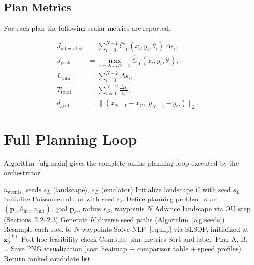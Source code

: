 \documentclass[11pt,a4paper]{article}
\begin{document}
\subsection{Plan Metrics}

For each plan the following scalar metrics are reported:

\begin{align}
  J_{\mathrm{integrated}} &= \sum_{i=0}^{N-2} \bar{C}_{\mathrm{fp}}(x_i, y_i, \theta_i)\,\Delta s_i, \\[4pt]
  J_{\mathrm{peak}}       &= \max_{i=0,\ldots,N-1} \hat{C}_{\mathrm{fp}}(x_i, y_i, \theta_i), \\[4pt]
  L_{\mathrm{total}}      &= \sum_{i=0}^{N-2} \Delta s_i, \\[4pt]
  T_{\mathrm{total}}      &= \sum_{i=0}^{N-2} \frac{\Delta s_i}{\bar{v}_i}, \\[4pt]
  d_{\mathrm{goal}}       &= \|(x_{N-1} - x_G,\; y_{N-1} - y_G)\|_2.
\end{align}

\section{Full Planning Loop}

Algorithm~\ref{alg:main} gives the complete online planning loop executed by
the orchestrator.

\begin{algorithm}[H]
\caption{Online constrained path-planning loop}
\label{alg:main}
\begin{algorithmic}[1]
\Require $n_{\mathrm{events}}$, seeds $s_L$ (landscape), $s_E$ (emulator)
\State Initialize landscape $C$ with seed $s_L$
\State Initialize Poisson emulator with seed $s_E$
\State Define planning problem:
       start $(\mathbf{p}_s, \theta_{\mathrm{init}}, v_{\mathrm{init}})$,
       goal $\mathbf{p}_G$, radius $r_G$, waypoints $N$
\State {} 
  \State Advance landscape via OU step (Sections~2.2--2.3)
  \State {}
\EndFor
\Statex
{}
  \State Generate $K$ diverse seed paths (Algorithm~\ref{alg:seeds})
  \State Resample each seed to $N$ waypoints
    \State Solve NLP~\eqref{eq:nlp} via SLSQP, initialized at $\mathbf{z}_0^{(k)}$
    \State Post-hoc feasibility check
    \State Compute plan metrics
  \EndFor
  \State Sort and label: Plan A, B, \ldots
  \State Save PNG visualization (cost heatmap + comparison table + speed profiles)
  \State Return ranked candidate list
\EndProcedure
\end{algorithmic}
\end{algorithm}
\end{document}
